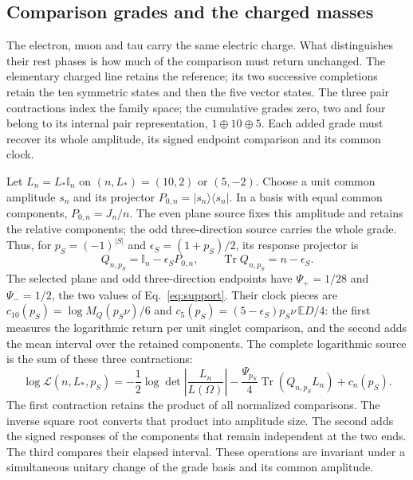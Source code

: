 \documentclass[aps,prx,onecolumn,10pt,notitlepage,nofootinbib,longbibliography]{revtex4-2}
\numberwithin{equation}{section}
\numberwithin{table}{section}
\newcommand{\Id}{\mathbb I}
\newcommand{\EE}{\mathbb E}
\newcommand{\Tr}{\operatorname{Tr}}
\begin{document}
\subsection{Comparison grades and the charged masses}
The electron, muon and tau carry the same electric charge. What distinguishes their rest phases is how much of the comparison must return unchanged. The elementary charged line retains the reference; its two successive completions retain the ten symmetric states and then the five vector states. The three pair contractions index the family space; the cumulative grades zero, two and four belong to its internal pair representation, $1\oplus10\oplus5$. Each added grade must recover its whole amplitude, its signed endpoint comparison and its common clock.

Let $L_n=L_*\Id_n$ on $(n,L_*)=(10,2)$ or $(5,-2)$. Choose a unit common amplitude $s_n$ and its projector $P_{0,n}=|s_n\rangle\langle s_n|$. In a basis with equal common components, $P_{0,n}=J_n/n$. The even plane source fixes this amplitude and retains the relative components; the odd three-direction source carries the whole grade. Thus, for $p_S=(-1)^{|S|}$ and $\epsilon_S=(1+p_S)/2$, its response projector is
\begin{equation}
 Q_{n,p_S}=\Id_n-\epsilon_SP_{0,n},\qquad
 \Tr Q_{n,p_S}=n-\epsilon_S.
 \label{eq:gradesourceprojector}
\end{equation}
The selected plane and odd three-direction endpoints have $\Psi_+=1/28$ and $\Psi_-=1/2$, the two values of Eq.~\eqref{eq:support}. Their clock pieces are $c_{10}(p_S)=\log M_Q(p_S\nu)/6$ and $c_5(p_S)=(5-\epsilon_S)p_S\nu\,\EE D/4$: the first measures the logarithmic return per unit singlet comparison, and the second adds the mean interval over the retained components. The complete logarithmic source is the sum of these three contractions:
\begin{equation}
 \boxed{\log\mathcal L(n,L_*,p_S)=
 -\frac12\log\det\left|\frac{L_n}{L(\Omega)}\right|
 -\frac{\Psi_{p_S}}4\Tr(Q_{n,p_S}L_n)+c_n(p_S).}
 \label{eq:gradesourcefunctional}
\end{equation}
The first contraction retains the product of all normalized comparisons. The inverse square root converts that product into amplitude size. The second adds the signed responses of the components that remain independent at the two ends. The third compares their elapsed interval. These operations are invariant under a simultaneous unitary change of the grade basis and its common amplitude.
\end{document}
